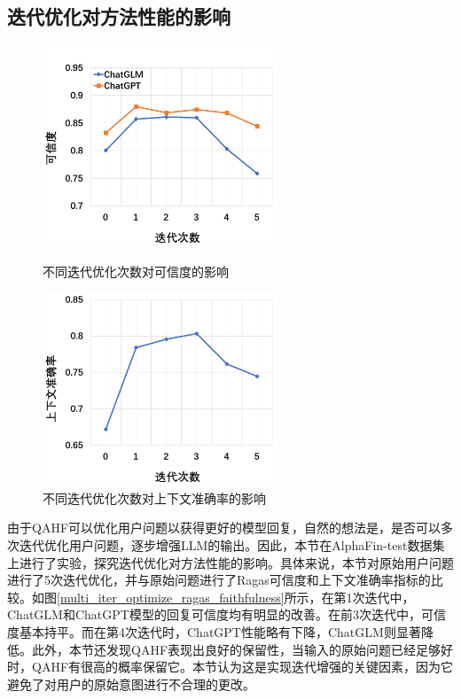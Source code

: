 \subsection{迭代优化对方法性能的影响}

\begin{figure}[htbp]
	\centering
	\begin{minipage}[t]{0.49\textwidth}
		\centering
		\includegraphics[width=7cm]{Fig/multi_iter_optimize_ragas_faithfulness.png}
		\caption{\label{multi_iter_optimize_ragas_faithfulness}不同迭代优化次数对可信度的影响}
	\end{minipage}
	\begin{minipage}[t]{0.49\textwidth}
		\centering
		\includegraphics[width=7cm]{Fig/multi_iter_optimize_ragas_precision.png}
		\caption{\label{multi_iter_optimize_ragas_precision}不同迭代优化次数对上下文准确率的影响}
	\end{minipage}
\end{figure}

由于QAHF可以优化用户问题以获得更好的模型回复，自然的想法是，是否可以多次迭代优化用户问题，逐步增强LLM的输出。因此，本节在AlphaFin-test数据集上进行了实验，探究迭代优化对方法性能的影响。具体来说，本节对原始用户问题进行了5次迭代优化，并与原始问题进行了Ragas可信度和上下文准确率指标的比较。如图\ref{multi_iter_optimize_ragas_faithfulness}所示，在第1次迭代中，ChatGLM和ChatGPT模型的回复可信度均有明显的改善。在前3次迭代中，可信度基本持平。而在第4次迭代时，ChatGPT性能略有下降，ChatGLM则显著降低。此外，本节还发现QAHF表现出良好的保留性，当输入的原始问题已经足够好时，QAHF有很高的概率保留它。本节认为这是实现迭代增强的关键因素，因为它避免了对用户的原始意图进行不合理的更改。

